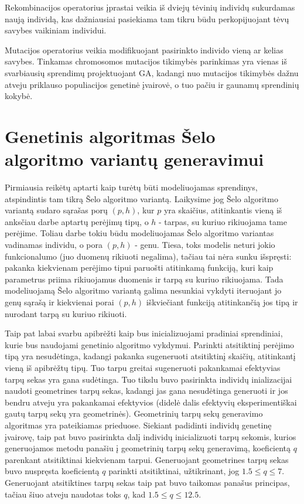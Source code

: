 \documentclass{VUMIFInfBakalaurinis}
\begin{document}
Rekombinacijos operatorius įprastai veikia iš dviejų tėvinių individų sukurdamas naują individą, kas dažniausiai pasiekiama
tam tikru būdu perkopijuojant tėvų savybes vaikiniam individui.

Mutacijos operatorius veikia modifikuojant pasirinkto individo vieną ar kelias savybes.
Tinkamas chromosomos mutacijos tikimybės parinkimas yra vienas iš svarbiausių sprendimų projektuojant GA,
kadangi nuo mutacijos tikimybės dažnu atveju priklauso populiacijos genetinė įvairovė, o tuo pačiu ir gaunamų sprendinių kokybė.

\section{Genetinis algoritmas Šelo algoritmo variantų generavimui}

Pirmiausia reikėtų aptarti kaip turėtų būti modeliuojamas sprendinys, atspindintis tam tikrą Šelo algoritmo variantą.
Laikysime jog Šelo algoritmo variantą sudaro sąrašas porų $(p, h)$, kur $p$ yra skaičius, atitinkantis vieną iš anksčiau darbe aptartų perėjimų tipų,
o $h$ - tarpas, su kuriuo rikiuojama tame perėjime.
Toliau darbe tokiu būdu modeliuojamas Šelo algoritmo variantas vadinamas individu, o pora $(p, h)$ - genu.
Tiesa, toks modelis neturi jokio funkcionalumo (juo duomenų rikiuoti negalima), tačiau tai nėra sunku išspręsti: pakanka kiekvienam perėjimo tipui
paruošti atitinkamą funkciją, kuri kaip parametrus priima rikiuojamus duomenis ir tarpą su kuriuo rikiuojama.
Tada modeliuojamą Šelo algoritmo variantą galima nesunkiai vykdyti iteruojant jo genų sąrašą ir kiekvienai porai $(p, h)$ iškviečiant funkciją atitinkančią jos tipą ir nurodant tarpą su kuriuo rikiuoti.

Taip pat labai svarbu apibrėžti kaip bus inicializuojami pradiniai sprendiniai, kurie bus naudojami genetinio algoritmo vykdymui.
Parinkti atsitiktinį perėjimo tipą yra nesudėtinga, kadangi pakanka sugeneruoti atsitiktinį skaičių, atitinkantį vieną iš apibrėžtų tipų.
Tuo tarpu greitai sugeneruoti pakankamai efektyvias tarpų sekas yra gana sudėtinga.
Tuo tikslu buvo pasirinkta individų inializacijai naudoti geometrines tarpų sekas, kadangi jas gana nesudėtinga generuoti
ir jos bendru atveju yra pakankamai efektyvios (didelė dalis efektyvių eksperimentiškai gautų tarpų sekų yra geometrinės).
Geometrinių tarpų sekų generavimo algoritmas yra pateikiamas prieduose.
Siekiant padidinti individų genetinę įvairovę, taip pat buvo pasirinkta dalį individų inicializuoti
tarpų sekomis, kurios generuojamos metodu panašiu į geometrinių tarpų sekų generavimą, koeficientą $q$ parenkant atsitiktinai kiekvienam tarpui.
Generuojant geometrines tarpų sekas buvo nuspręsta koeficientą $q$ parinkti atsitiktinai, užtikrinant, jog $1.5 \leq q \leq 7$.
Generuojant atsitiktines tarpų sekas taip pat buvo taikomas panašus principas, tačiau šiuo atveju naudotas toks $q$, kad $1.5 \leq q \leq 12.5$.
\end{document}
